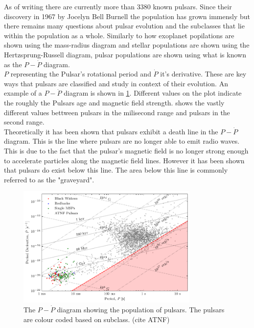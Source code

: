 As of writing there are currently more than 3380 known pulsars. Since their discovery in 1967 by Jocelyn Bell Burnell the population has grown immensly but there remains many questions about pulsar evolution and the subclasses that lie within the population as a whole. Similarly to how exoplanet popilations are shown using the mass-radius diagram and stellar populations are shown using the Hertzsprung-Russell diagram, pulsar populations are shown using what is known as the $P-\dot P$ diagram. \\

$P$ representing the Pulsar's rotational period and $\dot P$ it's derivative. These are key ways that pulsars are classified and study in context of their evolution. An example of a $P-\dot P$ diagram is shown in \cref{fig:p-pdot}. Different values on the plot indicate the roughly the Pulsars age and magnetic field strength.  shows the vastly different values bettween pulsars in the milisecond range and pulsars in the second range. \\ 

Theoretically it has been shown that pulsars exhibit a death line in the $P-\dot P$ diagram. This is the line where pulsars are no longer able to emit radio waves. This is due to the fact that the pulsar's magnetic field is no longer strong enough to accelerate particles along the magnetic field lines. However it has been shown that pulsars do exist below this line. The area below this line is commonly referred to as the "graveyard". \\
\begin{figure}
    \centering
    \includegraphics[width=0.8\textwidth]{figs/PPdot-diagram.pdf}
    \caption{The $P-\dot P$ diagram showing the population of pulsars. The pulsars are colour coded based on subclass. (cite ATNF)}
    \label{fig:p-pdot}
\end{figure}


